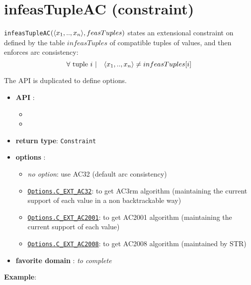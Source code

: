\label{infeastupleac}
\hypertarget{infeastupleac}{}

\section{infeasTupleAC (constraint)}\label{infeastupleac:infeastupleacconstraint}\hypertarget{infeastupleac:infeastupleacconstraint}{}
\begin{notedef}
  \texttt{infeasTupleAC}$(\langle x_1,..,x_n\rangle,feasTuples)$ states an extensional constraint on  defined by the table $infeasTuples$ of compatible tuples of values, and then enforces arc consistency:
      $$\forall \text{ tuple } i\ |\quad \langle x_1,..,x_n\rangle\neq infeasTuples[i]$$
\end{notedef}

The API is duplicated to define options.
\begin{itemize}
	\item \textbf{API} :
	\begin{itemize}
		\item {}
		\item {}
	\end{itemize}
	\item \textbf{return type}: \texttt{Constraint}
	\item \textbf{options} :
	\begin{itemize}
		\item \emph{no option}: use AC32 (default arc consistency)
		\item \hyperlink{cext32:cext32options}{\tt Options.C\_EXT\_AC32}: to get AC3rm algorithm (maintaining the current support of each value in a non backtrackable way)
		\item \hyperlink{cext2001:cext2001options}{\tt Options.C\_EXT\_AC2001}: to get AC2001 algorithm (maintaining the current support of each value)
		\item \hyperlink{cext2008:cext2008options}{\tt Options.C\_EXT\_AC2008}: to get AC2008 algorithm (maintained by STR)
	\end{itemize}
	\item \textbf{favorite domain} : \emph{to complete}
\end{itemize}

\textbf{Example}:

